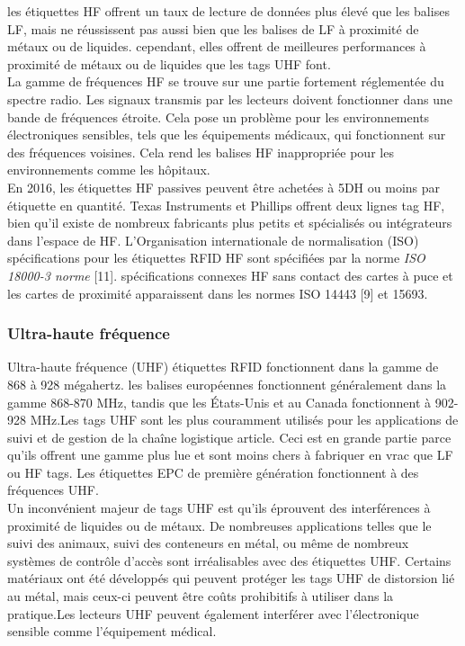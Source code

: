 \documentclass[11pt, a4paper, twoside]{book}
\begin{document}
les étiquettes HF offrent un taux de lecture de données plus élevé que les balises LF, mais ne réussissent pas aussi bien que les balises de LF à proximité de métaux ou de liquides. cependant, elles offrent de meilleures performances à proximité de métaux ou de liquides que les tags UHF font.\\

La gamme de fréquences HF se trouve sur une partie fortement réglementée du spectre radio. Les signaux transmis par les lecteurs doivent fonctionner dans une bande de fréquences étroite. Cela pose un problème pour les environnements électroniques sensibles, tels que les équipements médicaux, qui fonctionnent sur des fréquences voisines. Cela rend les balises HF inappropriée pour les environnements comme les hôpitaux.\\

En 2016, les étiquettes HF passives peuvent être achetées à 5DH ou moins par étiquette en quantité. Texas Instruments et Phillips offrent deux lignes tag HF, bien qu'il existe de nombreux fabricants plus petits et spécialisés ou intégrateurs dans l'espace de HF.
L'Organisation internationale de normalisation (ISO) spécifications pour les étiquettes RFID HF sont spécifiées par la norme \emph{ISO 18000-3 norme} [11]. spécifications connexes HF sans contact des cartes à puce et les cartes de proximité apparaissent dans les normes ISO 14443 [9] et 15693.
\subsubsection{Ultra-haute fréquence}
Ultra-haute fréquence (UHF) étiquettes RFID fonctionnent dans la gamme de 868 à 928 mégahertz. les balises européennes fonctionnent généralement dans la gamme 868-870 MHz, tandis que les États-Unis et au Canada fonctionnent à 902-928 MHz.Les tags UHF sont les plus couramment utilisés pour les applications de suivi et de gestion de la chaîne logistique article. Ceci est en grande partie parce qu'ils offrent une gamme plus lue et sont moins chers à fabriquer en vrac que LF ou HF tags. Les étiquettes EPC de première génération fonctionnent à des fréquences UHF.\\

Un inconvénient majeur de tags UHF est qu'ils éprouvent des interférences à proximité de liquides ou de métaux. De nombreuses applications telles que le suivi des animaux, suivi des conteneurs en métal, ou même de nombreux systèmes de contrôle d'accès sont irréalisables avec des étiquettes UHF. Certains matériaux ont été développés qui peuvent protéger les tags UHF de distorsion lié au métal, mais ceux-ci peuvent être coûts prohibitifs à utiliser dans la pratique.Les lecteurs UHF peuvent également interférer avec l'électronique sensible comme l'équipement médical.\\
\end{document}
